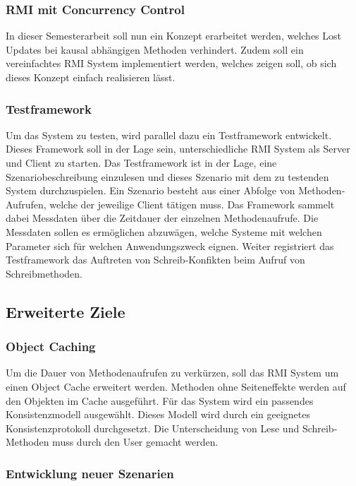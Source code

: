 \documentclass{article}
\begin{document}
\subsubsection{RMI mit Concurrency Control}
\label{sec:rmi-mit-concurrency}

In dieser Semesterarbeit soll nun ein Konzept erarbeitet werden, welches Lost Updates bei kausal abhängigen Methoden verhindert.  Zudem soll ein vereinfachtes RMI System implementiert werden, welches zeigen soll, ob sich dieses Konzept einfach realisieren lässt.

\subsubsection{Testframework}
\label{sec:testframework}

Um das System zu testen, wird parallel dazu ein Testframework entwickelt. Dieses Framework soll in der Lage sein, unterschiedliche RMI System als Server und Client zu starten. Das Testframework ist in der Lage, eine Szenariobeschreibung einzulesen und dieses Szenario mit dem zu testenden System durchzuspielen. Ein Szenario besteht aus einer Abfolge von Methoden-Aufrufen, welche der jeweilige Client tätigen muss. Das Framework sammelt dabei Messdaten über die Zeitdauer der einzelnen Methodenaufrufe. Die Messdaten sollen es ermöglichen abzuwägen, welche Systeme mit welchen Parameter sich für welchen Anwendungszweck eignen.
Weiter registriert das Testframework das Auftreten von Schreib-Konfikten beim Aufruf von Schreibmethoden.

\subsection{Erweiterte Ziele}
\label{sec:erweiterte-ziele}

\subsubsection{Object Caching}
\label{sec:object-caching}

Um die Dauer von Methodenaufrufen zu verkürzen, soll das RMI System um einen Object Cache erweitert werden. Methoden ohne Seiteneffekte werden auf den Objekten im Cache ausgeführt. Für das System wird ein passendes Konsistenzmodell ausgewählt. Dieses Modell wird durch ein geeignetes Konsistenzprotokoll durchgesetzt. Die Unterscheidung von Lese und Schreib- Methoden muss durch den User gemacht werden.

\subsubsection{Entwicklung neuer Szenarien}
\label{sec:entwicklung-neuer-szenarien}
\end{document}
